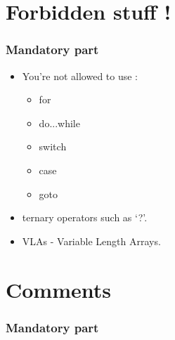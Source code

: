 \documentclass{42-en}
\begin{document}
    \section{Forbidden stuff !}

        \subsubsection{Mandatory part}

            \begin{itemize}

    			\item You're not allowed to use :

                    \begin{itemize}

                      \item for
                	    \item do...while
                	    \item switch
                	    \item case
            		      \item goto

                    \end{itemize}

                \item ternary operators such as `?'.

                \item VLAs - Variable Length Arrays.

            \end{itemize}

    \section{Comments}

        \subsubsection{Mandatory part}
\end{document}
